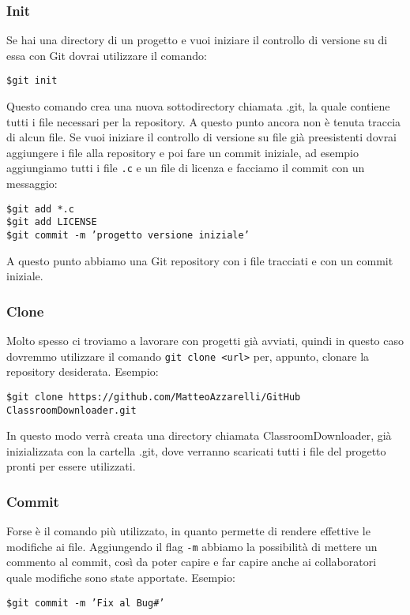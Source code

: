 			\subsubsection*{Init}
				Se hai una directory di un progetto e vuoi iniziare il controllo di versione su di essa con Git dovrai utilizzare il comando:
				\begin{tcolorbox}
					\texttt{\$\qquad git init}
				\end{tcolorbox}
				Questo comando crea una nuova sottodirectory chiamata .git, la quale contiene tutti i file necessari per la repository.
				A questo punto ancora non è tenuta traccia di alcun file.
				Se vuoi iniziare il controllo di versione su file già preesistenti dovrai aggiungere i file alla repository e poi fare un commit iniziale, ad esempio aggiungiamo tutti i file \verb|.c| e un file di licenza  e facciamo il commit con un messaggio:
				\begin{tcolorbox}
					\texttt{\$\qquad git add *.c \\ \$\qquad git add LICENSE \\ \$\qquad git commit -m 'progetto versione iniziale'}
				\end{tcolorbox}
				A questo punto abbiamo una Git repository con i file tracciati e con un commit iniziale.
			
			\subsubsection*{Clone}
				Molto spesso ci troviamo a lavorare con progetti già avviati, quindi in questo caso dovremmo utilizzare il comando \verb|git clone <url>| per, appunto, clonare la repository desiderata. Esempio:
				\begin{tcolorbox}
					\texttt{\$\qquad git clone https://github.com/MatteoAzzarelli/GitHub\\ClassroomDownloader.git}
				\end{tcolorbox}
				In questo modo verrà creata una directory chiamata ClassroomDownloader, già inizializzata con la cartella .git, dove verranno scaricati tutti i file del progetto pronti per essere utilizzati.
				 
			
			\subsubsection*{Commit}
				Forse è il comando più utilizzato, in quanto permette di rendere effettive le modifiche ai file. Aggiungendo il flag \verb|-m| abbiamo la possibilità di mettere un commento al commit, così da poter capire e far capire anche ai collaboratori quale modifiche sono state apportate. Esempio:
				\begin{tcolorbox}
					\texttt{\$\qquad git commit -m 'Fix al Bug\#'}
				\end{tcolorbox}
			
